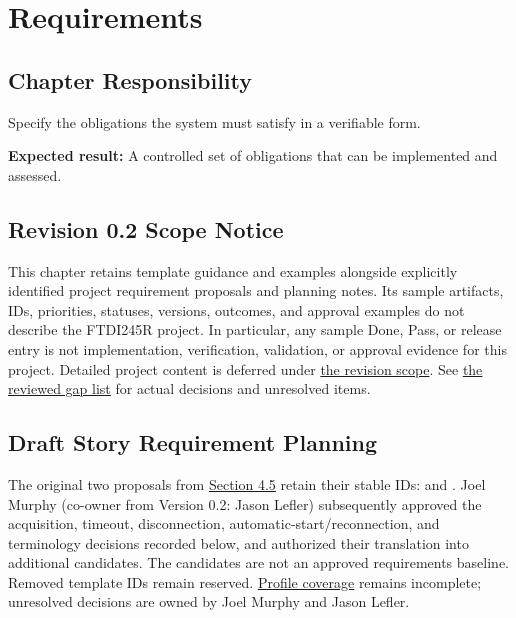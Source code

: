 \chapter{Requirements}

\section{Chapter Responsibility}
\label{Section:RequirementsResponsibility}
Specify the obligations the system must satisfy in a verifiable form.

\noindent\textbf{Expected result:} A controlled set of obligations that can be implemented and assessed.

\section{Revision 0.2 Scope Notice}
\label{Section:DeferredRequirements}
\begin{fsaNote}
This chapter retains template guidance and examples alongside explicitly
identified project requirement proposals and planning notes.
Its sample artifacts, IDs, priorities, statuses, versions, outcomes, and
approval examples do not describe the FTDI245R project. In particular, any
sample Done, Pass, or release entry is not implementation, verification,
validation, or approval evidence for this project. Detailed project content
is deferred under \hyperref[Section:ProjectScope]{the revision scope}.
See \hyperref[Table:ProjectGapReview]{the reviewed gap list} for actual
decisions and unresolved items.
\end{fsaNote}

\section{Draft Story Requirement Planning}
\label{Section:DraftStoryRequirements}
The original two proposals from \hyperref[Table:UserStories]{Section 4.5}
retain their stable IDs:  and
. Joel Murphy (co-owner from Version 0.2: Jason Lefler) subsequently approved the acquisition,
timeout, disconnection, automatic-start/reconnection, and terminology decisions
recorded below, and authorized their translation into additional candidates.
The candidates are not an approved requirements baseline. Removed template
IDs remain reserved. \hyperref[Table:ProjectProfileConcernCoverage]{Profile
coverage} remains incomplete; unresolved decisions are owned by Joel Murphy and Jason Lefler.


